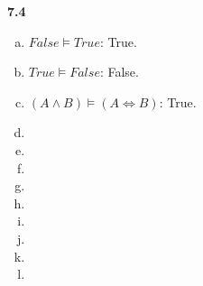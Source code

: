 \documentclass{scrartcl}
\begin{document}
\textbf{7.4}
\begin{enumerate}[(a)]
    \item $False \models True$: True.
    \item $True \models False$: False.
    \item $(A \land B) \models (A \Leftrightarrow B)$: True.
    \item
    \item
    \item
    \item
    \item
    \item
    \item
    \item
    \item
\end{enumerate}
\end{document}
